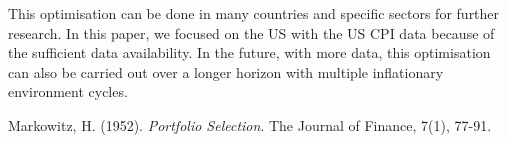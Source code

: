 \documentclass{article}
\begin{document}
This optimisation can be done in many countries and specific sectors for further research. In this paper, we focused on the US with the US CPI data because of the sufficient data availability. In the future, with more data, this optimisation can also be carried out over a longer horizon with multiple inflationary environment cycles.

\begin{thebibliography}{9}

Markowitz, H. (1952).
\textit{Portfolio Selection}.
The Journal of Finance, 7(1), 77-91.

\end{thebibliography}
\end{document}
